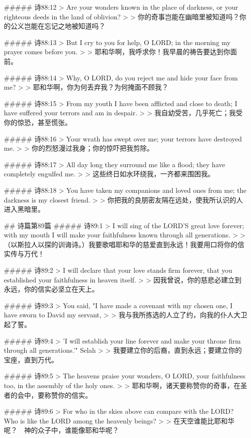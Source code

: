 ##### 诗88:12
> Are your wonders known in the place of darkness, or your righteous deeds in the land of oblivion?
>
> 你的奇事岂能在幽暗里被知道吗？你的公义岂能在忘记之地被知道吗？


##### 诗88:13
> But I cry to you for help, O LORD; in the morning my prayer comes before you.
>
> 耶和华啊，我呼求你！我早晨的祷告要达到你面前。


##### 诗88:14
> Why, O LORD, do you reject me and hide your face from me?
>
> 耶和华啊，你为何丢弃我？为何掩面不顾我？


##### 诗88:15
> From my youth I have been afflicted and close to death; I have suffered your terrors and am in despair.
>
> 我自幼受苦，几乎死亡；我受你的惊恐，甚至慌张。


##### 诗88:16
> Your wrath has swept over me; your terrors have destroyed me.
>
> 你的烈怒漫过我身；你的惊吓把我剪除。


##### 诗88:17
> All day long they surround me like a flood; they have completely engulfed me.
>
> 这些终日如水环绕我，一齐都来围困我。


##### 诗88:18
> You have taken my companions and loved ones from me; the darkness is my closest friend.
>
> 你把我的良朋密友隔在远处，使我所认识的人进入黑暗里。


## 诗篇第89篇
##### 诗89:1
> I will sing of the LORD'S great love forever; with my mouth I will make your faithfulness known through all generations.
>
> （以斯拉人以探的训诲诗。）我要歌唱耶和华的慈爱直到永远！我要用口将你的信实传与万代！


##### 诗89:2
> I will declare that your love stands firm forever, that you established your faithfulness in heaven itself.
>
> 因我曾说，你的慈悲必建立到永远，你的信实必坚立在天上。


##### 诗89:3
> You said, "I have made a covenant with my chosen one, I have sworn to David my servant,
>
> 我与我所拣选的人立了约，向我的仆人大卫起了誓。


##### 诗89:4
> 'I will establish your line forever and make your throne firm through all generations.'" Selah
>
> 我要建立你的后裔，直到永远；要建立你的宝座，直到万代。


##### 诗89:5
> The heavens praise your wonders, O LORD, your faithfulness too, in the assembly of the holy ones.
>
> 耶和华啊，诸天要称赞你的奇事，在圣者的会中，要称赞你的信实。


##### 诗89:6
> For who in the skies above can compare with the LORD? Who is like the LORD among the heavenly beings?
>
> 在天空谁能比耶和华呢？　神的众子中，谁能像耶和华呢？


